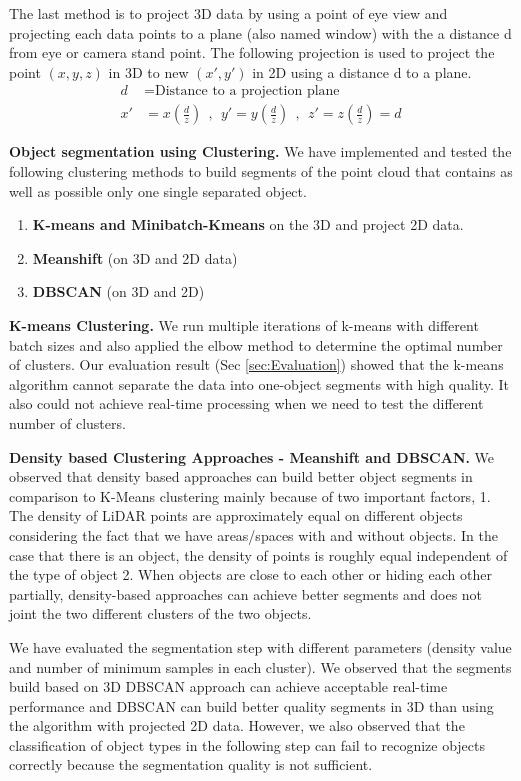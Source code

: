 The last method is to project 3D data by using a point of eye view and projecting each data points
to a plane (also named window) with the a distance d from eye or camera stand point. 
The following projection is used to project the point $(x,y,z)$ in 3D to new $(x',  y')$ in 2D
using a distance d to a plane.
\begin{align*}
d  & = \text{Distance to a projection plane} \\
x' & =  x (\frac{d}{z}) \ \  , \ \  y' =  y (\frac{d}{z}) \ \  , \ \  z'=  z (\frac{d}{z}) = d
\end{align*}

\textbf{Object segmentation using Clustering.} We have implemented and tested the following clustering methods to build segments of the point cloud 
that contains as well as possible only one single separated object.

\begin{enumerate}
  \item \textbf{K-means and Minibatch-Kmeans} on the 3D and project 2D data.
  \item \textbf{Meanshift} (on 3D and 2D data)
  \item \textbf{DBSCAN}  (on 3D and 2D)
\end{enumerate}

\textbf{K-means Clustering.} We run multiple iterations of k-means with different batch sizes and also applied the elbow method to determine the optimal
 number of clusters.
Our evaluation result (Sec \ref{sec:Evaluation}) showed that the k-means algorithm cannot separate the data into one-object segments with high quality. 
It also could not achieve real-time processing when we need to test the different number of clusters.

\textbf{Density based Clustering Approaches - Meanshift and DBSCAN.} We observed that density based approaches can build better object segments 
in comparison to K-Means clustering mainly because of two important factors, 1. The density of LiDAR points are approximately equal on different 
objects considering the fact that we have areas/spaces with and without objects. In the case that there is an object, the density of points is 
roughly equal independent of the type of object 2. When objects are close to each other or hiding each other partially, density-based approaches 
can achieve better segments and does not joint the two different clusters of the two objects.

We have evaluated the segmentation step with different parameters (density value and number of minimum samples in each cluster). 
We observed that the segments build based on 3D DBSCAN approach can achieve acceptable real-time performance and  DBSCAN can build better 
quality segments in 3D than using the algorithm with projected 2D data. However, we also observed that the classification of object types 
in the following step can fail to recognize objects correctly because the segmentation quality is not sufficient.


